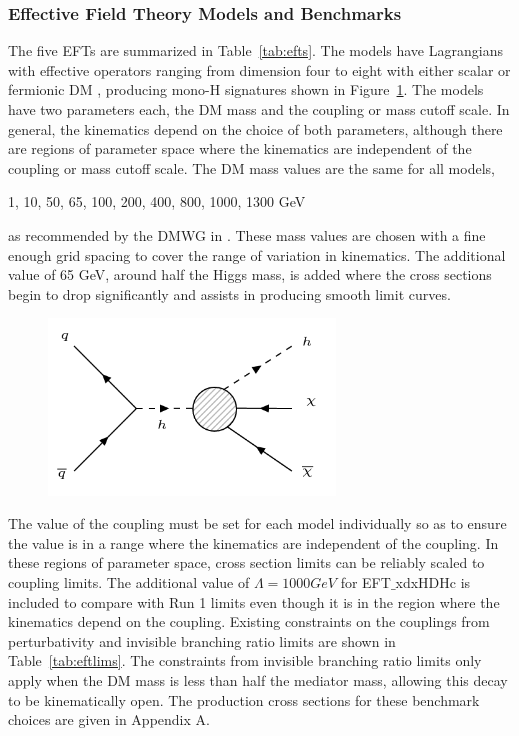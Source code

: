 \subsubsection{Effective Field Theory Models and Benchmarks}

The five EFTs are summarized in Table~\ref{tab:efts}. The models have Lagrangians with effective operators ranging from dimension four to eight with either scalar or fermionic DM \cite{McDonald:1993ex, LopezHonorez:2012kv}, producing mono-H signatures shown in Figure~\ref{fig:eftsig}. The models have two parameters each, the DM mass and the coupling or mass cutoff scale. In general, the kinematics depend on the choice of both parameters, although there are regions of parameter space where the kinematics are independent of the coupling or mass cutoff scale. The DM mass values are the same for all models, 
\begin{center}
1, 10, 50, 65, 100, 200, 400, 800, 1000, 1300 GeV
\end{center}
as recommended by the DMWG in \cite{Abercrombie:2015wmb}. These mass values are chosen with a fine enough grid spacing to cover the range of variation in kinematics. The additional value of 65 GeV, around half the Higgs mass, is added where the cross sections begin to drop significantly and assists in producing smooth limit curves.

\begin{figure}[tbh]
\centering
\includegraphics[width=3in]{figures/eftsig.png}
\caption{}
\label{fig:eftsig}
\end{figure}

The value of the coupling must be set for each model individually so as to ensure the value is in a range where the kinematics are independent of the coupling. In these regions of parameter space, cross section limits can be reliably scaled to coupling limits. The additional value of $\Lambda = 1000 GeV$ for EFT$\_$xdxHDHc is included to compare with Run 1 limits even though it is in the region where the kinematics depend on the coupling. Existing constraints on the couplings from perturbativity \cite{Carpenter:2013xra} and invisible branching ratio limits \cite{Belanger:2013kya, PhysRevD.86.010001} are shown in Table~\ref{tab:eftlims}. The constraints from invisible branching ratio limits only apply when the DM mass is less than half the mediator mass, allowing this decay to be kinematically open. The production cross sections for these benchmark choices are given in Appendix A.

